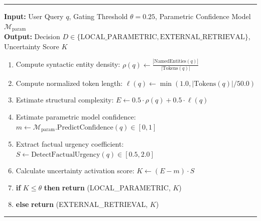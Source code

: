 \documentclass[fleqn,10pt]{article}
\begin{document}
\begin{minipage}{\textwidth}
\vspace{1em}
\vspace{0.4em}
\hrule
\vspace{0.4em}
\textbf{Input:} User Query $q$, Gating Threshold $\theta = 0.25$, Parametric Confidence Model $\mathcal{M}_{\text{param}}$\\
\textbf{Output:} Decision $D \in \{\text{LOCAL\_PARAMETRIC}, \text{EXTERNAL\_RETRIEVAL}\}$, Uncertainty Score $K$
\begin{enumerate}[leftmargin=2em,noitemsep]
    \item Compute syntactic entity density: $\rho(q) \leftarrow \frac{|\text{NamedEntities}(q)|}{|\text{Tokens}(q)|}$
    \item Compute normalized token length: $\ell(q) \leftarrow \min(1.0, |\text{Tokens}(q)| / 50.0)$
    \item Estimate structural complexity: $E \leftarrow 0.5 \cdot \rho(q) + 0.5 \cdot \ell(q)$
    \item Estimate parametric model confidence: $m \leftarrow \mathcal{M}_{\text{param}}.\text{PredictConfidence}(q) \in [0, 1]$
    \item Extract factual urgency coefficient: $S \leftarrow \text{DetectFactualUrgency}(q) \in [0.5, 2.0]$
    \item Calculate uncertainty activation score: $K \leftarrow (E - m) \cdot S$
    \item \textbf{if} $K \le \theta$ \textbf{then} \textbf{return} (LOCAL\_PARAMETRIC, $K$)
    \item \textbf{else} \textbf{return} (EXTERNAL\_RETRIEVAL, $K$)
\end{enumerate}
\vspace{0.4em}
\hrule
\vspace{1.2em}
\end{minipage}
\end{document}
